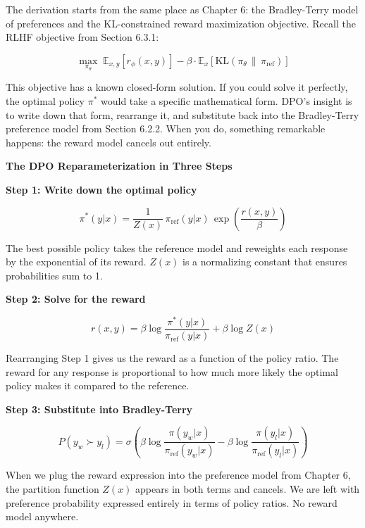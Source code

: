 \begin{chapterenv}
The derivation starts from the same place as Chapter 6: the Bradley-Terry model of preferences and the KL-constrained reward maximization objective. Recall the RLHF objective from Section 6.3.1:

$$\max_{\pi_\theta} \; \mathbb{E}_{x,y}\!\left[r_\phi(x,y)\right] - \beta \cdot \mathbb{E}_x\!\left[\text{KL}(\pi_\theta \,\|\, \pi_{\text{ref}})\right]$$

This objective has a known closed-form solution. If you could solve it perfectly, the optimal policy $\pi^*$ would take a specific mathematical form. DPO's insight is to write down that form, rearrange it, and substitute back into the Bradley-Terry preference model from Section 6.2.2. When you do, something remarkable happens: the reward model cancels out entirely.

\textbf{The DPO Reparameterization in Three Steps}

\begin{infobox}
\textbf{Step 1: Write down the optimal policy}

$$\pi^*(y|x) = \frac{1}{Z(x)}\, \pi_{\text{ref}}(y|x)\, \exp\!\left(\frac{r(x,y)}{\beta}\right)$$

The best possible policy takes the reference model and reweights each response by the exponential of its reward. $Z(x)$ is a normalizing constant that ensures probabilities sum to 1.
\end{infobox}

\begin{infobox}
\textbf{Step 2: Solve for the reward}

$$r(x,y) = \beta \log \frac{\pi^*(y|x)}{\pi_{\text{ref}}(y|x)} + \beta \log Z(x)$$

Rearranging Step 1 gives us the reward as a function of the policy ratio. The reward for any response is proportional to how much more likely the optimal policy makes it compared to the reference.
\end{infobox}

\begin{infobox}
\textbf{Step 3: Substitute into Bradley-Terry}

$$P(y_w \succ y_l) = \sigma\!\left(\beta \log \frac{\pi(y_w|x)}{\pi_{\text{ref}}(y_w|x)} - \beta \log \frac{\pi(y_l|x)}{\pi_{\text{ref}}(y_l|x)}\right)$$

When we plug the reward expression into the preference model from Chapter 6, the partition function $Z(x)$ appears in both terms and cancels. We are left with preference probability expressed entirely in terms of policy ratios. No reward model anywhere.
\end{infobox}


\end{chapterenv}
